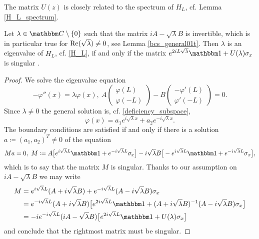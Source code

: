 The matrix $U(z)$ is closely related to the spectrum of $H_L$, cf. Lemma \ref{H_L_spectrum}.

\begin{lemma}\label{bcs_special01t}
Let $\lambda\in\C\setminus\{0\}$ such that the matrix $iA-\sqrt{\lambda}B$ is invertible, which is in particular true
for $\operatorname{Re}(\sqrt{\lambda})\neq 0$, see Lemma \ref{bcs_general01t}. Then $\lambda$ is an eigenvalue of $H_L$, cf. \eqref{H_L}, 
if and only if the matrix $e^{2iL\sqrt{\lambda}}\id + U(\lambda)\sigma_x$ is singular .
\end{lemma}
\begin{proof}
We solve the eigenvalue equation
\begin{equation*}
  -\varphi''(x) = \lambda\varphi(x), \ 
A
\begin{pmatrix}
  \varphi(L) \\ \varphi(-L)
\end{pmatrix}
-
B
\begin{pmatrix}
  -\varphi'(L) \\ \varphi'(-L)
\end{pmatrix}
= 0 .
\end{equation*}
Since $\lambda\neq 0$ the general solution is, cf. \eqref{deficiency_subspace},
\begin{equation*}
  \varphi(x) = a_1 e^{i\sqrt{\lambda}x} + a_2 e^{-i\sqrt{\lambda}x} .
\end{equation*}
The boundary conditions are satisfied if and only if there is a solution $a\coloneqq (a_1,a_2)^T\neq 0$ of the equation
\begin{equation*}
 M a = 0,\ 
 M\coloneqq  A \big[ e^{i\sqrt{\lambda}L}\id + e^{-i\sqrt{\lambda}L}\sigma_x \big] 
    - i\sqrt{\lambda}B\big[ -e^{i\sqrt{\lambda}L}\id + e^{-i\sqrt{\lambda}L}\sigma_x \big],
\end{equation*}
which is to say that the matrix $M$ is singular. Thanks to our assumption on $iA-\sqrt{\lambda}B$ we may write
\begin{equation*}
\begin{split}
   M & = e^{i\sqrt{\lambda}L}( A+i\sqrt{\lambda}B) + e^{-i\sqrt{\lambda}L}( A-i\sqrt{\lambda}B)\sigma_x \\
     & = e^{-i\sqrt{\lambda}L} (A+i\sqrt{\lambda}B)\big[ e^{2i\sqrt{\lambda}L}\id + (A+i\sqrt{\lambda}B)^{-1}(A-i\sqrt{\lambda}B)\sigma_x \big]\\
     & = -i e^{-i\sqrt{\lambda}L} (iA-\sqrt{\lambda}B)\big[ e^{2i\sqrt{\lambda}L}\id + U(\lambda) \sigma_x \big]
\end{split}
\end{equation*}
and conclude that the rightmost matrix must be singular.
\end{proof}
